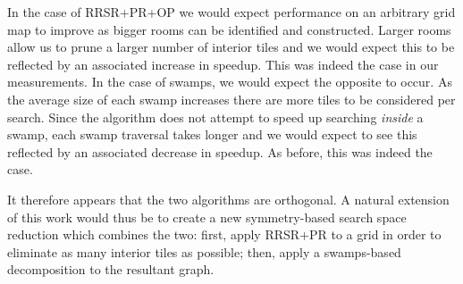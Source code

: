 In the case of RRSR+PR+OP we would expect performance on an arbitrary grid map to improve as bigger
rooms can be identified and constructed. 
Larger rooms allow us to prune a larger number of interior tiles and we would expect this to be reflected
by an associated increase in speedup. This was indeed the case in our measurements.
In the case of swamps, we would expect the opposite to occur. As the average size of each swamp increases
there are more tiles to be considered per search. Since the algorithm does not attempt to speed up searching
\emph{inside} a swamp, each swamp traversal takes longer and we would expect to see this reflected
by an associated decrease in speedup. As before, this was indeed the case.

It therefore appears that the two algorithms are orthogonal.
A natural extension of this work would thus be to create a new symmetry-based search space reduction
which combines the two: first, apply RRSR+PR to a grid in order to eliminate as many interior tiles 
as possible; then, apply a swamps-based decomposition to the resultant graph.

